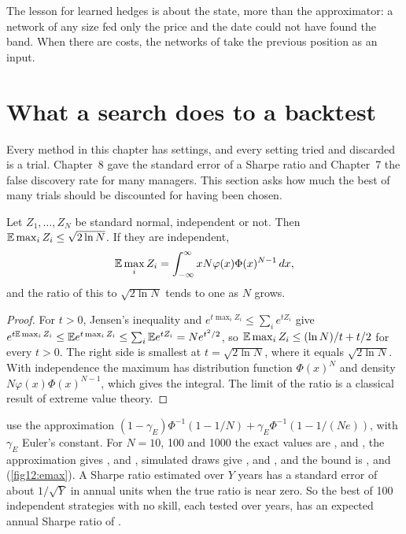 \begin{chapterrefs}
The lesson for learned hedges is about the state, more than the approximator: a network of any size fed
only the price and the date could not have found the band. When there are costs, the networks of
\textcite{buehler2019} take the previous position as an input.

\FloatBarrier
\section{What a search does to a backtest}
\label{sec12:overfit}

Every method in this chapter has settings, and every setting tried and discarded is a trial. Chapter~8
gave the standard error of a Sharpe ratio and Chapter~7 the false discovery rate for many managers. This
section asks how much the best of many trials should be discounted for having been chosen.

\begin{proposition}\label{prop12:emax}
Let $Z_1,\dots,Z_N$ be standard normal, independent or not. Then $\mathbb{E}\max_iZ_i\le\sqrt{2\ln N}$. If they are
independent,
\[
  \mathbb{E}\max_iZ_i=\int_{-\infty}^\infty xN\varphi(x)\Phi(x)^{N-1}\,dx ,
\]
and the ratio of this to $\sqrt{2\ln N}$ tends to one as $N$ grows.
\end{proposition}

\begin{proof}
For $t>0$, Jensen's inequality and $e^{t\max_iZ_i}\le\sum_ie^{tZ_i}$ give
$e^{t\mathbb{E}\max_iZ_i}\le\mathbb{E} e^{t\max_iZ_i}\le\sum_i\mathbb{E} e^{tZ_i}=Ne^{t^2/2}$, so $\mathbb{E}\max_iZ_i\le(\ln N)/t+t/2$ for every
$t>0$. The right side is smallest at $t=\sqrt{2\ln N}$, where it equals $\sqrt{2\ln N}$. With independence the
maximum has distribution function $\Phi(x)^N$ and density $N\varphi(x)\Phi(x)^{N-1}$, which gives the integral.
The limit of the ratio is a classical result of extreme value theory.
\end{proof}

\Textcite{bailey2014} use the approximation
$(1-\gamma_E)\Phi^{-1}(1-1/N)+\gamma_E\Phi^{-1}(1-1/(Ne))$, with $\gamma_E$ Euler's constant. For $N=10$, 100 and
1000 the exact values are \ovMaxTen, \ovMaxHundred{} and \ovMaxThousand, the approximation gives
\ovApproxTen, \ovApproxHundred{} and \ovApproxThousand, \ovSimReps{} simulated draws give \ovSimTen,
\ovSimHundred{} and \ovSimThousand, and the bound is \ovBoundTen, \ovBoundHundred{} and \ovBoundThousand{}
(\cref{fig12:emax}). A Sharpe ratio estimated over $Y$ years has a standard error of about $1/\sqrt Y$ in annual
units when the true ratio is near zero. So the best of 100 independent strategies with no skill, each
tested over \ovYears{} years, has an expected annual Sharpe ratio of \ovMaxSrHundred.


\end{chapterrefs}
